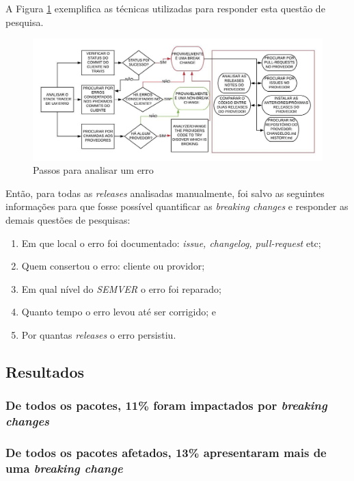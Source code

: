 A Figura \ref{fig:step_analyze} exemplifica as técnicas utilizadas para responder esta questão de pesquisa.

\begin{figure}
    \centering
    \includegraphics[scale=0.73]{figuras/step_analyze_pt.jpeg}
    \caption{Passos para analisar um erro}
    \label{fig:step_analyze}
\end{figure}

Então, para todas as \textit{releases} analisadas manualmente, foi salvo as seguintes informações para que fosse possível quantificar as \textit{breaking changes} e responder as demais questões de pesquisas:

\begin{enumerate}
    \item Em que local o erro foi documentado: \textit{issue, changelog, pull-request} etc;
    \item Quem consertou o erro: cliente ou providor;
    \item Em qual nível do \textit{SEMVER} o erro foi reparado;
    \item Quanto tempo o erro levou até ser corrigido; e
    \item Por quantas \textit{releases} o erro persistiu.
\end{enumerate}{}

\subsection{Resultados}
\label{fin:rq1}

\subsubsection{De todos os pacotes, 11\% foram impactados por \textit{breaking changes}}

\subsubsection{De todos os pacotes afetados, 13\% apresentaram mais de uma \textit{breaking change}}

